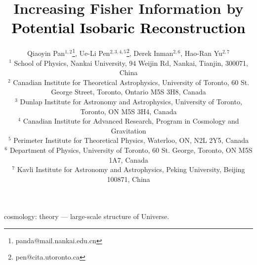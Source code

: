 \documentclass[fleqn,useAMS,usenatbib]{mnras}
\newcommand{\tcr}{\textcolor{black}}
\begin{document}
\title[Information increase by \tcr{Potential Isobaric Reconstruction}]
{Increasing Fisher Information by \tcr{Potential Isobaric Reconstruction}}
\author[Pan et al.]
{Qiaoyin Pan$^{1,2}$\thanks{panda@mail.nankai.edu.cn},
Ue-Li Pen$^{2,3,4,5}$\thanks{pen@cita.utoronto.ca},
Derek Inman$^{2,6}$,
Hao-Ran Yu$^{2,7}$\\
$^{1}$ School of Physics, Nankai University, 94 Weijin Rd, Nankai, Tianjin, 300071, China\\
$^{2}$ Canadian Institute for Theoretical Astrophysics, University of Toronto, 60 St. George Street, Toronto, Ontario M5S 3H8, Canada\\
$^{3}$ Dunlap Institute for Astronomy and Astrophysics, University of Toronto, Toronto, ON M5S 3H4, Canada\\
$^{4}$ Canadian Institute for Advanced Research, Program in Cosmology and Gravitation\\
$^{5}$ Perimeter Institute for Theoretical Physics, Waterloo, ON, N2L 2Y5, Canada\\
$^{6}$ Department of Physics, University of Toronto, 60 St. George, Toronto, ON M5S 1A7, Canada\\
$^{7}$ Kavli Institute for Astronomy and Astrophysics, Peking University, Beijing 100871, China}

\pagerange{\pageref{firstpage}--\pageref{lastpage}} 
\maketitle
\label{firstpage}



\begin{keywords}
  cosmology: theory --- large-scale structure of Universe.
\end{keywords}
















\bsp	%
\label{lastpage}
\end{document}
